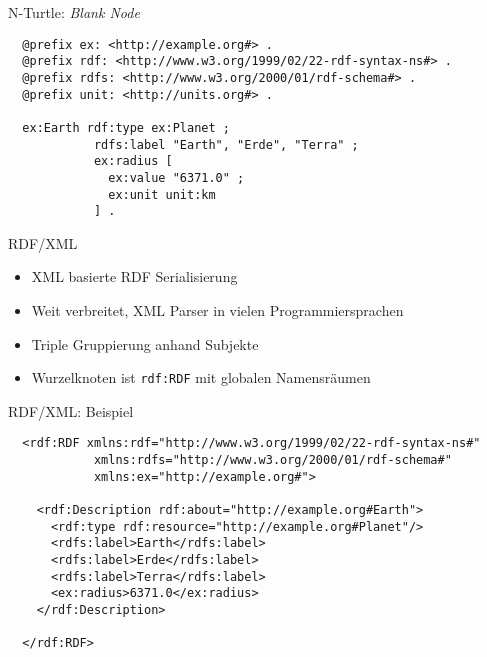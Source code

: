 \documentclass{beamer}
\begin{document}
\begin{frame}[fragile]{N-Turtle: \emph{Blank Node}}
	
	\small
	\begin{lstlisting}
  @prefix ex: <http://example.org#> .
  @prefix rdf: <http://www.w3.org/1999/02/22-rdf-syntax-ns#> .
  @prefix rdfs: <http://www.w3.org/2000/01/rdf-schema#> .
  @prefix unit: <http://units.org#> .
	  
  ex:Earth rdf:type ex:Planet ;
            rdfs:label "Earth", "Erde", "Terra" ;
            ex:radius [
              ex:value "6371.0" ;
              ex:unit unit:km
            ] .
	\end{lstlisting}
	
\end{frame}

\begin{frame}{RDF/XML}
	
	\begin{itemize}
		\item XML basierte RDF Serialisierung
		\item Weit verbreitet, XML Parser in vielen Programmiersprachen
		\item Triple Gruppierung anhand Subjekte
		\item Wurzelknoten ist \texttt{rdf:RDF} mit globalen Namensräumen
	\end{itemize}
	
\end{frame}

\begin{frame}[fragile]{RDF/XML: Beispiel}
	
	\footnotesize
	\begin{lstlisting}
  <rdf:RDF xmlns:rdf="http://www.w3.org/1999/02/22-rdf-syntax-ns#"
            xmlns:rdfs="http://www.w3.org/2000/01/rdf-schema#"
            xmlns:ex="http://example.org#">
	
    <rdf:Description rdf:about="http://example.org#Earth">
      <rdf:type rdf:resource="http://example.org#Planet"/>
      <rdfs:label>Earth</rdfs:label>
      <rdfs:label>Erde</rdfs:label>
      <rdfs:label>Terra</rdfs:label>
      <ex:radius>6371.0</ex:radius>
    </rdf:Description>
	
  </rdf:RDF>		
	\end{lstlisting}
	
\end{frame}
\end{document}
